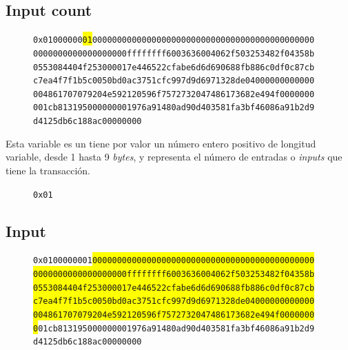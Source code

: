 \documentclass{article}
\begin{document}
    \subsection{Input count}
    
    \begin{figure}[H]
        \texttt{0x01000000\colorbox{Yellow}{01}000000000000000000000000000000000000000000000} \\
        \texttt{0000000000000000000ffffffff6003636004062f503253482f04358b} \\
        \texttt{0553084404f253000017e446522cfabe6d6d690688fb886c0df0c87cb} \\
        \texttt{c7ea4f7f1b5c0050bd0ac3751cfc997d9d6971328de04000000000000} \\
        \texttt{004861707079204e592120596f7572732047486173682e494f0000000} \\
        \texttt{001cb813195000000001976a91480ad90d403581fa3bf46086a91b2d9} \\
        \texttt{d4125db6c188ac00000000}
    \end{figure}
    
    Esta variable es un tiene por valor un número entero positivo de longitud variable, desde 1 hasta 9 \textit{bytes}, y representa el número de entradas o \textit{inputs} que tiene la transacción.
    \begin{figure}[H]
        \texttt{0x01}
    \end{figure}
    
    \subsection{Input}
    
    \begin{figure}[H]
        \texttt{0x0100000001\colorbox{Yellow}{000000000000000000000000000000000000000000000}} \\
        \texttt{\colorbox{Yellow}{0000000000000000000ffffffff6003636004062f503253482f04358b}} \\
        \texttt{\colorbox{Yellow}{0553084404f253000017e446522cfabe6d6d690688fb886c0df0c87cb}} \\
        \texttt{\colorbox{Yellow}{c7ea4f7f1b5c0050bd0ac3751cfc997d9d6971328de04000000000000}} \\
        \texttt{\colorbox{Yellow}{004861707079204e592120596f7572732047486173682e494f0000000}} \\
        \texttt{\colorbox{Yellow}{0}01cb813195000000001976a91480ad90d403581fa3bf46086a91b2d9} \\
        \texttt{d4125db6c188ac00000000}
    \end{figure}
    
\end{document}
